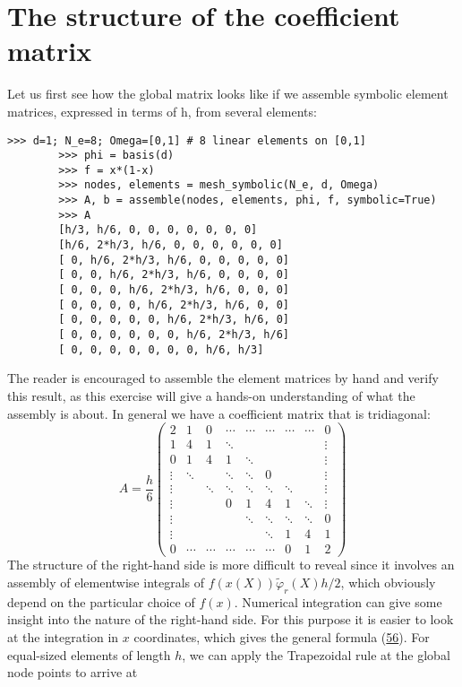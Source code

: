 \documentclass[../main.tex]{subfiles}
\begin{document}
	\section[The structure of the coefficient matrix]{The structure of the coefficient matrix}
	\label{sec:sec_4_6}
	\noindent Let us first see how the global matrix looks like if we assemble symbolic element
	matrices, expressed in terms of h, from several elements:
	\begin{lstlisting}[numbers=none]
		>>> d=1; N_e=8; Omega=[0,1] # 8 linear elements on [0,1]
		>>> phi = basis(d)
		>>> f = x*(1-x)
		>>> nodes, elements = mesh_symbolic(N_e, d, Omega)
		>>> A, b = assemble(nodes, elements, phi, f, symbolic=True)
		>>> A
		[h/3, h/6, 0, 0, 0, 0, 0, 0, 0]
		[h/6, 2*h/3, h/6, 0, 0, 0, 0, 0, 0]
		[ 0, h/6, 2*h/3, h/6, 0, 0, 0, 0, 0]
		[ 0, 0, h/6, 2*h/3, h/6, 0, 0, 0, 0]
		[ 0, 0, 0, h/6, 2*h/3, h/6, 0, 0, 0]
		[ 0, 0, 0, 0, h/6, 2*h/3, h/6, 0, 0]
		[ 0, 0, 0, 0, 0, h/6, 2*h/3, h/6, 0]
		[ 0, 0, 0, 0, 0, 0, h/6, 2*h/3, h/6]
		[ 0, 0, 0, 0, 0, 0, 0, h/6, h/3]	
	\end{lstlisting}
	The reader is encouraged to assemble the element matrices by hand and verify
	this result, as this exercise will give a hands-on understanding of what the
	assembly is about. In general we have a coefficient matrix that is tridiagonal:
	\begin{equation}\label{eqa79}
		A=\frac{h}{6}\left(\begin{array}{ccccccccc}
			2 & 1 & 0 & \cdots & \cdots & \cdots & \cdots & \cdots & 0 \\
			1 & 4 & 1 & \ddots & & & & & \vdots \\
			0 & 1 & 4 & 1 & \ddots & & & & \vdots \\
			\vdots & \ddots & & \ddots & \ddots & 0 & & & \vdots \\
			\vdots & & \ddots & \ddots & \ddots & \ddots & \ddots & & \vdots \\
			\vdots & & & 0 & 1 & 4 & 1 & \ddots & \vdots \\
			\vdots & & & & \ddots & \ddots & \ddots & \ddots & 0 \\
			\vdots & & & & & \ddots & 1 & 4 & 1 \\
			0 & \cdots & \cdots & \cdots & \cdots & \cdots & 0 & 1 & 2
		\end{array}\right)
	\end{equation}
	\bigbreak
	The structure of the right-hand side is more difficult to reveal since it involves an assembly of elementwise integrals of $f(x(X)) \tilde{\varphi}_{r}(X) h / 2$, which obviously depend on the particular choice of $f(x)$. Numerical integration can give some insight into the nature of the right-hand side. For this purpose it is easier to look at the integration in $x$ coordinates, which gives the general formula (\hyperref[eqa56]{56}). For equal-sized elements of length $h$, we can apply the Trapezoidal rule at the global node points to arrive at
\end{document}
